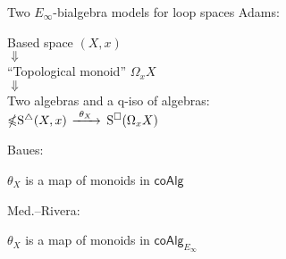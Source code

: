 \begin{frame}[fragile]{Two $E_\infty$-bialgebra models for loop spaces}
	\pause
	\textcolor{pblue}{Adams}:
	\vspace*{-11pt}
	\begin{center}
		Based space $(X,x)$ \\ \pause
		$\Downarrow$ \\
		``Topological monoid'' $\Omega_x X$ \\ \pause
		$\Downarrow$ \\
		Two algebras
		and a q-iso of algebras: \\
		\medskip
		$\mathbb{\Omega} \mathrm{S}^{\triangle}(X, x)$
		$\xrightarrow{\ \theta_X\ }$
		$\mathrm{S}^{\square}(\Omega_x X)$
	\end{center}

	\bigskip\pause
	\textcolor{pblue}{Baues}:
	\vspace*{-11pt}
	\begin{center}
		$\theta_X$ is a map of monoids in $\mathsf{coAlg}$
	\end{center}

	\bigskip\pause
	\textcolor{pblue}{Med.--Rivera}:
	\vspace*{-11pt}
	\begin{center}
		$\theta_X$ is a map of monoids in $\mathsf{coAlg}_{E_\infty}$
	\end{center}

\end{frame}


